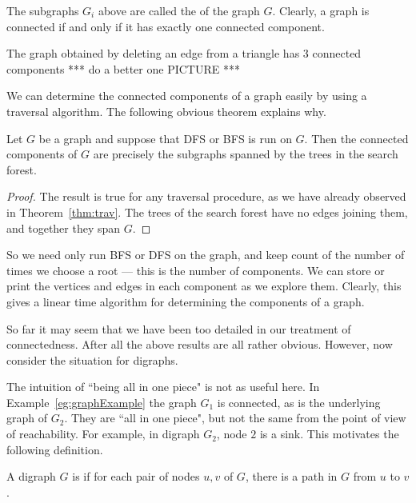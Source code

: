 The subgraphs $G_i$ above are called the 
of the graph $G$. Clearly, a graph is connected if and only if it has
exactly one connected component.

\begin{Example}
\label{eg:components}
The graph obtained by deleting an edge from a triangle has 3 connected components *** do a better one PICTURE ***

\end{Example}

We can determine the connected components of a graph easily by using a
traversal algorithm. The following obvious theorem explains why.

\begin{Theorem}
\label{thm:trav-comps}
Let $G$ be a graph and suppose that DFS or BFS is run on $G$. Then the
connected components of $G$ are precisely the subgraphs spanned by the
trees in the search forest. 
\end{Theorem}

\begin{proof}
The result is true for any traversal procedure, as we have already observed in Theorem~\ref{thm:trav}. The trees of the search forest have no edges joining them, and together they span $G$.
\end{proof}

So we need only run BFS or DFS on the graph, and keep count
of the number of times we choose a root --- this is the number of
components. We can store or print the vertices and edges in each
component as we explore them. Clearly, this gives a linear time algorithm
for determining the components of a graph.

So far it may seem that we have been too detailed in our treatment of 
connectedness. After all the above results are all rather obvious.
However, now consider the situation for digraphs.

The intuition of ``being all in one piece" is not as useful here. In
Example~\ref{eg:graphExample} the graph $G_1$ is connected, as is the
underlying graph of $G_2$. They are ``all in one piece", but not the
same from the point of view of reachability. For example, in digraph
$G_2$, node $2$ is a sink. This motivates the following definition.

\begin{Definition}
A digraph $G$ is  if for each pair of nodes $u, v$ of $G$, there is a path in $G$ from $u$ to $v$.
\end{Definition}

